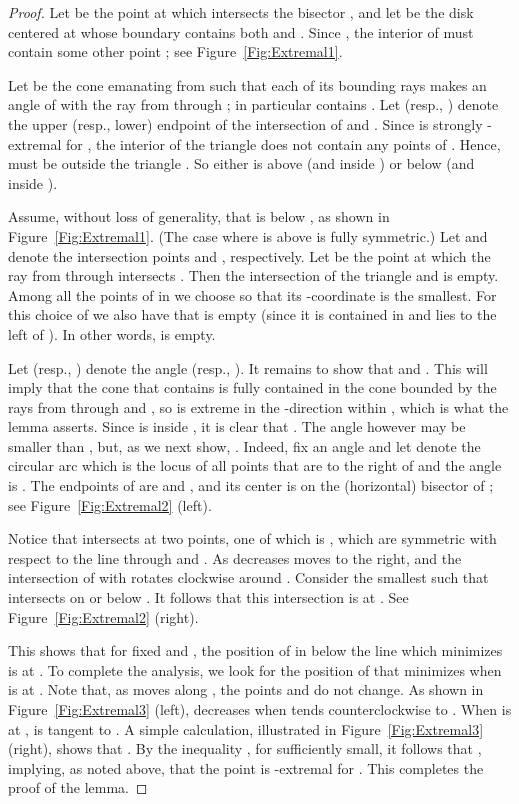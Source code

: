 \documentclass[letter,11pt]{article}
\begin{document}
\begin{proof}
Let  be the point at which  intersects the bisector
, and let  be the disk centered at 
whose boundary contains both  and . Since
, the interior of  must contain some other point ; see Figure~\ref{Fig:Extremal1}. 

Let  be the cone 
emanating from  such that each of its bounding rays makes an angle of
 with 
the ray from  through ;
 in particular  contains . 
Let  (resp., ) denote the upper (resp., lower) endpoint of the
intersection of   and  . Since  is strongly -extremal for
, the interior of the triangle  does not contain any
points of . Hence,  must be outside 
the triangle . So either  is above
  (and inside ) or below  (and inside ).


Assume, without loss of generality, that  is below , as shown in
Figure~\ref{Fig:Extremal1}. (The case where  is above
  is fully symmetric.) 
 Let  and  denote the intersection points
 and , respectively. Let 
be the point at which the ray 
from  through 
intersects . Then
the intersection of the triangle  and  is empty.
Among all the points of  in  we choose  so that its -coordinate is
the smallest. For this choice of  we also
have that  is empty (since it is contained in  and lies to the left of ).
In other words,  is empty.

Let  (resp., ) denote the angle 
(resp., ). It remains to show that
 and .
This will imply that the cone  that contains  is fully contained in the cone bounded by the rays from  through  and , so  is extreme in the -direction within , which is what the lemma asserts. Since  is inside , it is clear that
. 
The angle
 however may be smaller than , but, as we next show,
.
Indeed, fix an angle  and
let  denote the circular arc which is the locus of
all points  that are to the right of  and 
the angle  is 
. The endpoints of  are  and
, and its center  is on the (horizontal) bisector of
; see Figure~\ref{Fig:Extremal2} (left). 

Notice that  intersects  at two points, one of which is , which
are symmetric with respect to the line 
through  and .  As  decreases
 moves to the right, and the intersection of 
with  rotates clockwise around .
Consider the smallest  such that  intersects  on or below  . It follows that this intersection is at .
 See Figure~\ref{Fig:Extremal2} (right).


This shows that
for  fixed   and , the position of 
in  below the line  which minimizes  is at
. 
To complete the analysis, we look for the position of  that minimizes  when
 is at . 
Note that, as  moves along , the points  and  do not change.
As shown in Figure~\ref{Fig:Extremal3} (left),
  decreases when 
  tends counterclockwise to .
When  is at ,
  is tangent to .
A simple calculation, 
 illustrated in Figure~\ref{Fig:Extremal3} (right), shows that
 . By the
 inequality , for  sufficiently small, it follows that , implying, as noted above, that the point  is -extremal 
 for . This completes the proof of the lemma.
\end{proof}
\end{document}
